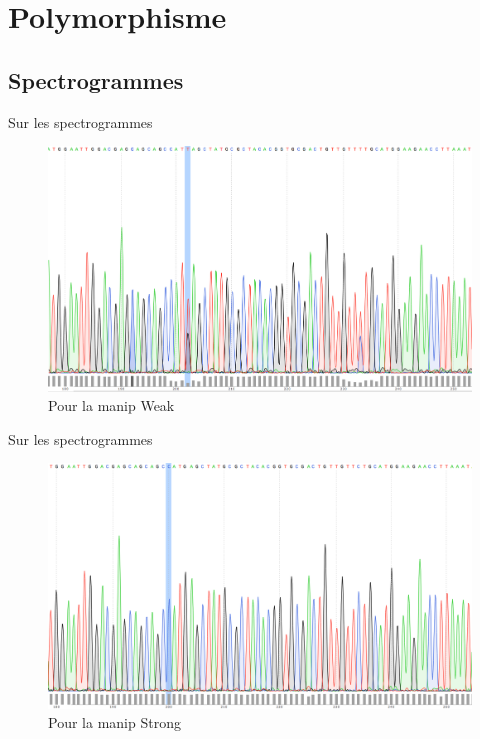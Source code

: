 \documentclass[xcolor=dvipsnames]{beamer}
\begin{document}
\section{Polymorphisme}
\subsection{Spectrogrammes}

\begin{frame}{Sur les spectrogrammes}
  \begin{figure}[htbp]
    \centering
    \includegraphics[width=\linewidth]{../weak_spectro.png}
    \caption*{Pour la manip Weak}
  \end{figure}

\end{frame}

\begin{frame}{Sur les spectrogrammes}
  \begin{figure}[htbp]
    \centering
    \includegraphics[width=\linewidth]{../strong_spectro.png}
    \caption*{Pour la manip Strong}
  \end{figure}

\end{frame}
\end{document}
